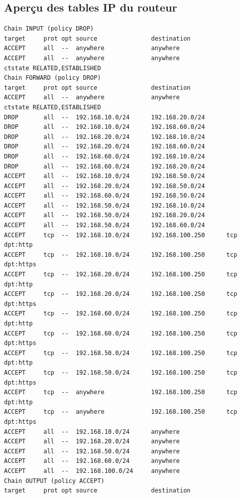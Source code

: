 \documentclass[a4paper,12pt,openany]{report}
\begin{document}
\begin{appendices}
        \chapter{Aperçu des tables IP du routeur}
            \begin{verbatim}
Chain INPUT (policy DROP)
target     prot opt source               destination         
ACCEPT     all  --  anywhere             anywhere            
ACCEPT     all  --  anywhere             anywhere             
ctstate RELATED,ESTABLISHED
Chain FORWARD (policy DROP)
target     prot opt source               destination         
ACCEPT     all  --  anywhere             anywhere             
ctstate RELATED,ESTABLISHED
DROP       all  --  192.168.10.0/24      192.168.20.0/24     
DROP       all  --  192.168.10.0/24      192.168.60.0/24     
DROP       all  --  192.168.20.0/24      192.168.10.0/24     
DROP       all  --  192.168.20.0/24      192.168.60.0/24     
DROP       all  --  192.168.60.0/24      192.168.10.0/24     
DROP       all  --  192.168.60.0/24      192.168.20.0/24     
ACCEPT     all  --  192.168.10.0/24      192.168.50.0/24     
ACCEPT     all  --  192.168.20.0/24      192.168.50.0/24     
ACCEPT     all  --  192.168.60.0/24      192.168.50.0/24     
ACCEPT     all  --  192.168.50.0/24      192.168.10.0/24     
ACCEPT     all  --  192.168.50.0/24      192.168.20.0/24     
ACCEPT     all  --  192.168.50.0/24      192.168.60.0/24     
ACCEPT     tcp  --  192.168.10.0/24      192.168.100.250      tcp dpt:http
ACCEPT     tcp  --  192.168.10.0/24      192.168.100.250      tcp dpt:https
ACCEPT     tcp  --  192.168.20.0/24      192.168.100.250      tcp dpt:http
ACCEPT     tcp  --  192.168.20.0/24      192.168.100.250      tcp dpt:https
ACCEPT     tcp  --  192.168.60.0/24      192.168.100.250      tcp dpt:http
ACCEPT     tcp  --  192.168.60.0/24      192.168.100.250      tcp dpt:https
ACCEPT     tcp  --  192.168.50.0/24      192.168.100.250      tcp dpt:http
ACCEPT     tcp  --  192.168.50.0/24      192.168.100.250      tcp dpt:https
ACCEPT     tcp  --  anywhere             192.168.100.250      tcp dpt:http
ACCEPT     tcp  --  anywhere             192.168.100.250      tcp dpt:https
ACCEPT     all  --  192.168.10.0/24      anywhere            
ACCEPT     all  --  192.168.20.0/24      anywhere            
ACCEPT     all  --  192.168.50.0/24      anywhere            
ACCEPT     all  --  192.168.60.0/24      anywhere            
ACCEPT     all  --  192.168.100.0/24     anywhere            
Chain OUTPUT (policy ACCEPT)
target     prot opt source               destination         
            \end{verbatim}
    \end{appendices}
        
\end{document}
